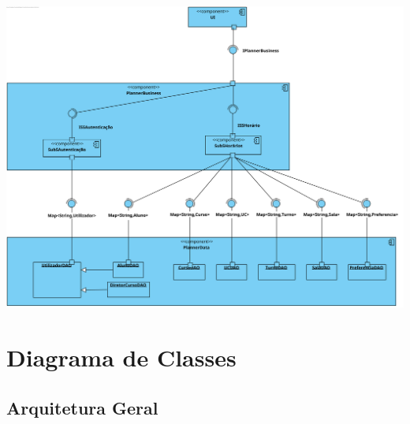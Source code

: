 \documentclass[a4paper,12pt]{scrreprt}
\begin{document}
\begin{minipage}{\textwidth}
    \centering
    \includegraphics[width=.95\textwidth]{images/components-diagrams/2.png}
    \label{fig:4-2-diagrama_de_componentes_daos}
\end{minipage}



\chapter{Diagrama de Classes}

\section{Arquitetura Geral}
\end{document}
